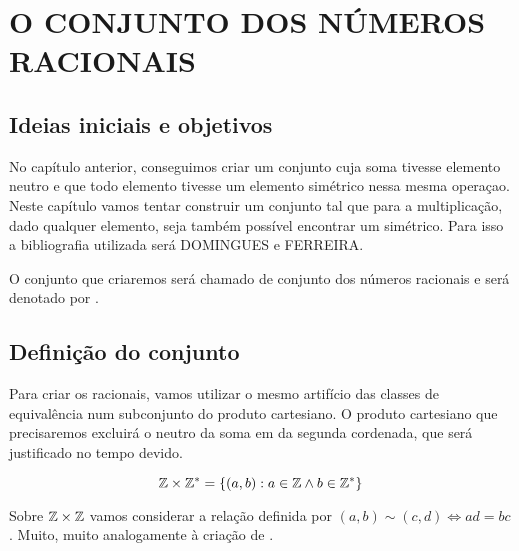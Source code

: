 \documentclass[../main.tex]{subfiles}
\begin{document}
\chapter{O CONJUNTO DOS NÚMEROS RACIONAIS}
\section{Ideias iniciais e objetivos}

No capítulo anterior, conseguimos criar um conjunto cuja soma tivesse elemento neutro e que todo elemento tivesse um elemento simétrico nessa mesma operaçao. Neste capítulo vamos tentar construir um conjunto tal que para a multiplicação, dado qualquer elemento, seja também possível encontrar um simétrico. Para isso a bibliografia utilizada será DOMINGUES e FERREIRA.

O conjunto que criaremos será chamado de conjunto dos números racionais e será denotado por \Q.

\section{Definição do conjunto}
Para criar os racionais, vamos utilizar o mesmo artifício das classes de equivalência num subconjunto do produto cartesiano. O produto cartesiano que precisaremos excluirá o neutro da soma em \Z da segunda cordenada, que será justificado no tempo devido.

$$\mathbb{Z} \times \mathbb{Z}^* = \{ \left( a,b \right) : a \in \mathbb{Z} \land b \in \mathbb{Z}^* \}$$

Sobre $\mathbb{Z} \times \mathbb{Z}$ vamos considerar a relação definida por $\left( a,b \right) \sim \left( c,d \right) \iff ad = bc$. Muito, muito analogamente à criação de \Z.
\end{document}
